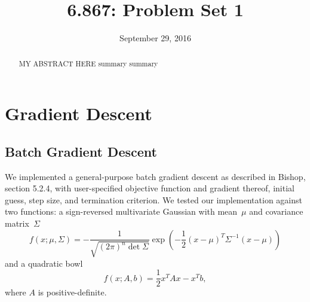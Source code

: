 \documentclass{amsart}
\title{6.867: Problem Set 1}
\date{September 29, 2016}
\begin{document}
\begin{abstract}
MY ABSTRACT HERE summary summary
\end{abstract}

\maketitle





\section{Gradient Descent}

\subsection{Batch Gradient Descent}

We implemented a general-purpose batch gradient descent as described in Bishop, section 5.2.4, with user-specified objective function and gradient thereof, initial guess, step size, and termination criterion. %
We tested our implementation against two functions: a sign-reversed multivariate Gaussian with mean~$\mu$ and covariance matrix~$\Sigma$
\begin{equation}
f(x; \mu, \Sigma) = -\frac{1}{\sqrt{(2\pi)^n \det\Sigma}}\exp\left( -\frac12(x - \mu)^T \Sigma^{-1}(x - \mu) \right)
\end{equation}
and a quadratic bowl
\begin{equation}
f(x; A, b) = \frac{1}{2}x^T Ax - x^T b,
\end{equation}
where $A$ is positive-definite.


\end{document}
